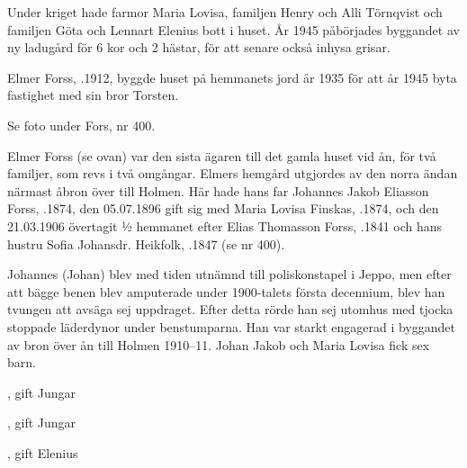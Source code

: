 Under kriget hade farmor Maria Lovisa, familjen Henry och Alli Törnqvist och familjen Göta och Lennart Elenius bott i huset. År 1945 påbörjades byggandet av ny ladugård för 6 kor och 2 hästar, för att senare också inhysa grisar.
\begin{jhchildren}
  \item {}
  \item {}
  \item {}
  \item {}
\end{jhchildren}


%
Elmer Forss, .1912, byggde huset på hemmanets jord år 1935 för att år 1945 byta fastighet med sin bror Torsten.


%

Se foto under Fors, nr 400.

%
Elmer Forss (se ovan) var den sista ägaren till det gamla huset vid ån, för två familjer, som revs i två omgångar. Elmers hemgård utgjordes av den norra ändan närmast åbron över till Holmen. Här hade hans far Johannes Jakob Eliasson Forss, .1874, den 05.07.1896 gift sig med Maria Lovisa Finskas, .1874, och den 21.03.1906 övertagit ½ hemmanet efter Elias Thomasson Forss, .1841 och hans hustru Sofia Johansdr. Heikfolk, .1847 (se nr 400).

Johannes (Johan) blev med tiden utnämnd till poliskonstapel i Jeppo, men efter att bägge benen blev amputerade under 1900-talets första decennium, blev han tvungen att avsäga sej uppdraget. Efter detta rörde han sej utomhus med tjocka stoppade läderdynor under benstumparna. Han var starkt engagerad i byggandet av bron över ån till Holmen 1910--11.
Johan Jakob och Maria Lovisa fick sex barn.
\begin{jhchildren}
  \item {}, gift Jungar
  \item {}
  \item {}, gift Jungar
  \item {}
  \item {}
  \item {}, gift Elenius
\end{jhchildren}

